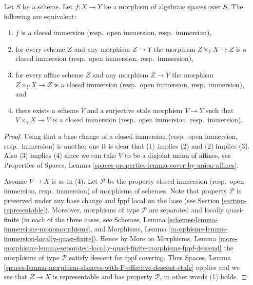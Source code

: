\begin{lemma}
\label{lemma-characterize-closed-immersion}
Let $S$ be a scheme. Let $f : X \to Y$ be a morphism of algebraic spaces
over $S$. The following are equivalent:
\begin{enumerate}
\item $f$ is a closed immersion (resp.\ open immersion, resp.\ immersion),
\item for every scheme $Z$ and any morphism $Z \to Y$ the morphism
$Z \times_Y X \to Z$ is a closed immersion (resp.\ open immersion,
resp.\ immersion),
\item for every affine scheme $Z$ and any morphism
$Z \to Y$ the morphism $Z \times_Y X \to Z$ is a closed immersion
(resp.\ open immersion, resp.\ immersion), and
\item there exists a scheme $V$ and a surjective etale morphism
$V \to Y$ such that $V \times_Y X \to V$ is a closed immersion
(resp.\ open immersion, resp.\ immersion).
\end{enumerate}
\end{lemma}

\begin{proof}
Using that a base change of a
closed immersion (resp.\ open immersion, resp.\ immersion)
is another one it is clear that (1) implies (2) and (2) implies (3).
Also (3) implies (4) since we can take $V$ to be a disjoint union of
affines, see
Properties of Spaces,
Lemma \ref{spaces-properties-lemma-cover-by-union-affines}.

\medskip\noindent
Assume $V \to X$ is as in (4).
Let $\mathcal{P}$ be the property
closed immersion (resp.\ open immersion, resp.\ immersion)
of morphisms of schemes. Note that property $\mathcal{P}$
is preserved under any base change and fppf local on the
base (see Section \ref{section-representable}).
Moreover, morphisms of type $\mathcal{P}$ are separated and
locally quasi-finite (in each of the three cases, see
Schemes, Lemma \ref{schemes-lemma-immersions-monomorphisms}, and
Morphisms, Lemma \ref{morphisms-lemma-immersion-locally-quasi-finite}).
Hence
by
More on Morphisms, Lemma
\ref{more-morphisms-lemma-separated-locally-quasi-finite-morphisms-fppf-descend}
the morphisms of type $\mathcal{P}$ satisfy descent for fppf covering. Thus
Spaces, Lemma \ref{spaces-lemma-morphism-sheaves-with-P-effective-descent-etale}
applies and we see that $Z \to X$ is representable and has property
$\mathcal{P}$, in other words (1) holds.
\end{proof}




